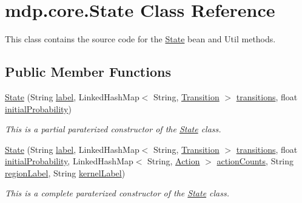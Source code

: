 \hypertarget{classmdp_1_1core_1_1_state}{}\section{mdp.\+core.\+State Class Reference}
\label{classmdp_1_1core_1_1_state}


This class contains the source code for the \hyperlink{classmdp_1_1core_1_1_state}{State} bean and Util methods.  


\subsection*{Public Member Functions}
\begin{DoxyCompactItemize}
\item 
\hyperlink{classmdp_1_1core_1_1_state_a7454bf82c89c8fbcf1133e8450af5042}{State} (String \hyperlink{classmdp_1_1core_1_1_state_a40b54cc46e175c748d5ce129aba70633}{label}, Linked\+Hash\+Map$<$ String, \hyperlink{classmdp_1_1core_1_1_transition}{Transition} $>$ \hyperlink{classmdp_1_1core_1_1_state_a3c9b563199f7e235fe083b0d16da8cf3}{transitions}, float \hyperlink{classmdp_1_1core_1_1_state_a237d2d5f81db0553a2180cf66a20472b}{initial\+Probability})
\begin{DoxyCompactList}\small\item\em This is a partial paraterized constructor of the \hyperlink{classmdp_1_1core_1_1_state}{State} class. \end{DoxyCompactList}\item 
\hyperlink{classmdp_1_1core_1_1_state_a5e137332befa3d6f57255172bf40ac97}{State} (String \hyperlink{classmdp_1_1core_1_1_state_a40b54cc46e175c748d5ce129aba70633}{label}, Linked\+Hash\+Map$<$ String, \hyperlink{classmdp_1_1core_1_1_transition}{Transition} $>$ \hyperlink{classmdp_1_1core_1_1_state_a3c9b563199f7e235fe083b0d16da8cf3}{transitions}, float \hyperlink{classmdp_1_1core_1_1_state_a237d2d5f81db0553a2180cf66a20472b}{initial\+Probability}, Linked\+Hash\+Map$<$ String, \hyperlink{classmdp_1_1core_1_1_action}{Action} $>$ \hyperlink{classmdp_1_1core_1_1_state_a8c44f739b3fe71dd166fc6ab59087d4f}{action\+Counts}, String \hyperlink{classmdp_1_1core_1_1_state_aa6f24dca5cb78d028e99f69b9e6ccb2c}{region\+Label}, String \hyperlink{classmdp_1_1core_1_1_state_ac7ca184df7a0ec4141766692290c18ab}{kernel\+Label})
\begin{DoxyCompactList}\small\item\em This is a complete paraterized constructor of the \hyperlink{classmdp_1_1core_1_1_state}{State} class. \end{DoxyCompactList}\item 

\end{DoxyCompactItemize}
